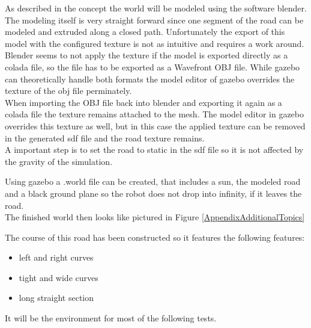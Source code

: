 As described in the concept the world will be modeled using the software blender.\\

The modeling itself is very straight forward since one segment of the road can be modeled and extruded along a closed path. Unfortunately the export of this model with the configured texture is not as intuitive and requires a work around.\\

Blender seems to not apply the texture if the model is exported directly as a colada file, so the file has to be exported as a Wavefront OBJ file. While gazebo can theoretically handle both formats the model editor of gazebo overrides the texture of the obj file perminately.\\

When importing the OBJ file back into blender and exporting it again as a colada file the texture remains attached to the mesh. The model editor in gazebo overrides this texture as well, but in this case the applied texture can be removed in the generated sdf file and the road texture remains.\\

A important step is to set the road to static in the sdf file so it is not affected by the gravity of the simulation.

Using gazebo a .world file can be created, that includes a sun, the modeled road and a black ground plane so the robot does not drop into infinity, if it leaves the road.\\

The finished world then looks like pictured in Figure \ref{AppendixAdditionalTopics}

The course of this road has been constructed so it features the following features:

\begin{itemize}
	\item left and right curves
	\item tight and wide curves
	\item long straight section
\end{itemize}

It will be the environment for most of the following tests.

